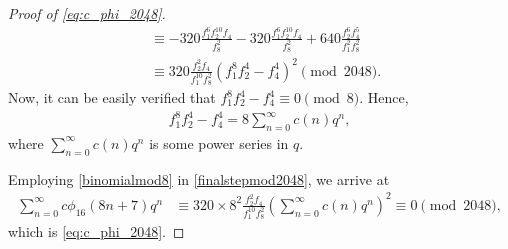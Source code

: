 \documentclass[12pt]{article}
\numberwithin{equation}{section}
\theoremstyle{plain}
\numberwithin{theorem}{section}
\theoremstyle{definition}
\theoremstyle{remark}
\begin{document}
\begin{proof}[Proof of \eqref{eq:c_phi_2048}]
\begin{align}
        &\equiv-320\frac{f_1^6 f_2^{10} f_4}{f_8^2}-320\frac{f_1^6 f_2^{10} f_4}{f_8^2}+640\frac{ f_2^6 f_4^5}{f_1^2 f_8^2}\nonumber\\
        &\equiv320\frac{ f_2^2 f_4 }{f_1^{10} f_8^2} \left(f_1^8 f_2^4-f_4^4\right)^2\pmod{2048}.\label{finalstepmod2048}
    \end{align}
    Now, it can be easily verified that $f_1^8 f_2^4-f_4^4\equiv0\pmod{8}$. Hence,
    \begin{align}
        f_1^8 f_2^4-f_4^4=8\sum_{n=0}^{\infty}c(n)q^n,\label{binomialmod8}
    \end{align}where $\displaystyle{\sum_{n=0}^{\infty}c(n)q^n}$ is some power series in $q$.
    
    Employing \eqref{binomialmod8} in \eqref{finalstepmod2048}, we arrive at
    \begin{align*}
         \sum_{n=0}^{\infty}c\phi_{16}(8n+7)q^n &\equiv320\times 8^2\frac{ f_2^2 f_4  }{f_1^{10} f_8^2}\left(\sum_{n=0}^{\infty}c(n)q^n\right)^2\equiv0\pmod{2048},
    \end{align*}
    which is \eqref{eq:c_phi_2048}.
    \end{proof}
\end{document}
